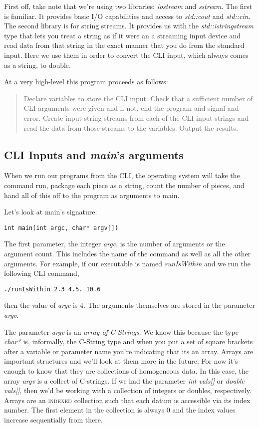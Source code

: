 \documentclass[]{tufte-handout}
\begin{document}
First off, take note that we're using two libraries: \textit{iostream} and \textit{sstream}. The first is familiar. It provides basic I/O capabilities and access to \textit{std::cout} and \textit{std::cin}. The second library is for string streams. It provides us with the \textit{std::istringstream} type that lets you treat a string as if it were an a streaming input device and read data from that string in the exact manner that you do from the standard input. Here we use them in order to convert the CLI input, which always comes as a string, to double.

At a very high-level this program proceeds as follows:
\begin{quote}
Declare variables to store the CLI input. Check that a sufficient number of CLI arguments were given and if not, end the program and signal and error. Create input string streams from each of the CLI input strings and read the data from those streams to the variables. Output the results.
\end{quote}

\subsection{CLI Inputs and \textit{main}'s arguments}

When we run our programs from the CLI, the operating system will take the command run, package each piece as a string, count the number of pieces, and hand all of this off to the program as arguments to main.

Let's look at main's signature:
\begin{verbatim}
int main(int argc, char* argv[])
\end{verbatim}
The first parameter, the integer \textit{argc}, is the number of arguments or the argument count. This includes the name of the command as well as all the other arguments. For example, if our executable is named \textit{runIsWithin} and we run the following CLI command,
\begin{verbatim}
./runIsWithin 2.3 4.5. 10.6
\end{verbatim}
then the value of \textit{argc} is 4. The arguments themselves are stored in the parameter \textit{argv}.

The parameter \textit{argv} is an \textit{array of C-Strings}. We know this because the type \textit{char*} is, informally, the C-String type and when you put a set of square brackets after a variable or parameter name you're indicating that its an array. Arrays are important structures and we'll look at them more in the future. For now it's enough to know that they are collections of homogeneous data. In this case, the array \textit{argv} is a collect of C-strings. If we had the parameter \textit{int vals[]} or \textit{double vals[]}, then we'd be working with a collection of integers or doubles, respectively. Arrays are an \textsc{indexed} collection such that each datum is accessible via its index number. The first element in the collection is always 0 and the index values increase sequentially from there.
\end{document}
